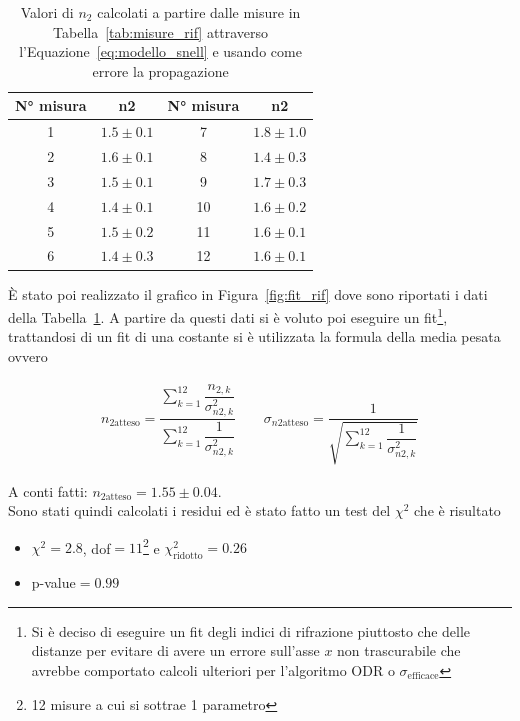 \documentclass[a4paper,12pt]{article}
\begin{document}
\begin{table}[h!]
    \centering
    \begin{tabular}{c c | c c }
        \toprule
        N° misura & n2 & N° misura & n2 \\
        \midrule
        1 &  $ 1.5 \pm 0.1$ & 7 &  $ 1.8 \pm 1.0$ \\
        2 &  $ 1.6 \pm 0.1$ & 8 &  $ 1.4 \pm 0.3$ \\
        3 &  $ 1.5 \pm 0.1$ & 9 &  $ 1.7 \pm 0.3$ \\
        4 &  $ 1.4 \pm 0.1$ & 10 & $ 1.6 \pm 0.2$ \\
        5 &  $ 1.5 \pm 0.2$ & 11 & $ 1.6 \pm 0.1$ \\
        6 &  $ 1.4 \pm 0.3$ & 12 & $ 1.6 \pm 0.1$ \\
        \bottomrule
    \end{tabular}
    \caption{Valori di $n_2$ calcolati a partire dalle misure in Tabella~\ref{tab:misure_rif} attraverso l'Equazione~\ref{eq:modello_snell} e usando come errore la propagazione}%
    \label{tab:n2_calc}
\end{table}

\`E stato poi realizzato il grafico in Figura~\ref{fig:fit_rif} dove sono riportati i dati della Tabella~\ref{tab:n2_calc}.
A partire da questi dati si è voluto poi eseguire un fit\footnote{Si è deciso di eseguire un fit degli indici di rifrazione piuttosto che delle distanze per evitare di avere un errore sull'asse $x$ non trascurabile che avrebbe comportato calcoli ulteriori per l'algoritmo ODR o $\sigma_{\text{efficace}}$}, trattandosi di un fit di una costante si è utilizzata la formula della media pesata ovvero

\begin{align}
    n_{2\text{atteso}} = \dfrac{\displaystyle\sum_{k=1}^{12} \dfrac{n_{2,k}}{\sigma_{n2,k}^2}}{\displaystyle\sum_{k=1}^{12} \dfrac{1}{\sigma_{n2,k}^2}} \qquad \sigma_{n2\text{atteso}} = \dfrac{1}{\sqrt{\displaystyle\sum_{k=1}^{12} \dfrac{1}{\sigma_{n2,k}^2}}}
\end{align}

A conti fatti: $n_{2\text{atteso}} = 1.55 \pm 0.04$.\\
Sono stati quindi calcolati i residui ed è stato fatto un test del $\chi^2$ che è risultato

\begin{itemize}
    \item $\chi^2 = 2.8$, dof$=11$\footnote{12 misure a cui si sottrae 1 parametro} e $\chi_{\text{ridotto}}^2 = 0.26$
    \item p-value$=0.99$
\end{itemize}
\end{document}
